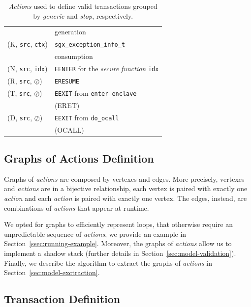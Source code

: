 \begin{table}[t]
\begin{tabular}{ll}
		&  generation \\ 
		(K, \texttt{src}, \texttt{ctx}) & \texttt{sgx\_exception\_info\_t} \\
		& consumption \\ 
		(N, \texttt{src}, \texttt{idx}) & \texttt{EENTER} for the \emph{secure 
			function} \texttt{idx} \\ 
		(R, \texttt{src}, $\oslash$) & \texttt{ERESUME} \\ 
		(T, \texttt{src}, $\oslash$) & \texttt{EEXIT} from 
		\texttt{enter\_enclave} \\
		& (ERET) \\ 
		(D, \texttt{src}, $\oslash$) & \texttt{EEXIT} from \texttt{do\_ocall} \\
		& (OCALL) \\ 
		\bottomrule
	\end{tabular} 
	\caption[Valid transations definition.]{\emph{Actions} used to 
	define valid transactions grouped by \emph{generic} and \emph{stop}, 
	respectively.}
	\label{tbl:actionss}
\end{table}


\subsection{Graphs of Actions Definition}
\label{ssec:graph-of-action}

Graphs of \emph{actions} are composed by vertexes and edges.
More precisely, vertexes and \emph{actions} are in a bijective relationship, 
\ie each vertex is paired with exactly one \emph{action} and each \emph{action}
is paired with exactly one vertex.
The edges, instead, are combinations of \emph{actions} that appear at 
runtime.

We opted for graphs to efficiently represent loops, that otherwise require
an unpredictable sequence of \emph{actions}, we provide an example in
Section~\ref{ssec:running-example}.
Moreover, the graphs of \emph{actions} allow us to implement a shadow stack  
(further details in Section~\ref{sec:model-validation}).
Finally, we describe the algorithm to extract the graphs of \emph{actions} in 
Section~\ref{sec:model-exctraction}.



\subsection{Transaction Definition}
\label{ssec:transaption-model}

